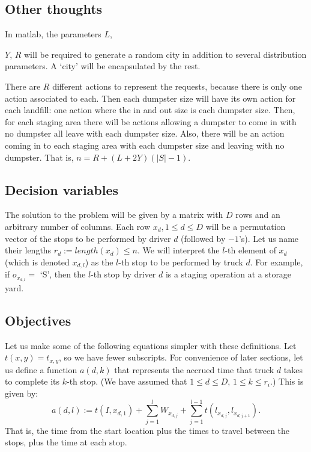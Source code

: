 \documentclass{article}
\begin{document}
\subsection{Other thoughts}

In matlab, the parameters 
  $L$,

  $Y$,
  $R$
will be required to generate a random city in addition to several distribution parameters.
A `city' will be encapsulated by the rest.

There are $R$ different actions to represent the requests, because there is only one action associated to each.
Then each dumpster size will have its own action for each landfill: one action where the in and out size is each dumpster size.
Then, for each staging area there will be actions allowing a dumpster to come in with no dumpster all leave with each dumpster size.
Also, there will be an action coming in to each staging area with each dumpster size and leaving with no dumpster.
That is, $n = R + (L + 2 Y) (|S| - 1)$.

\subsection{Decision variables}

The solution to the problem will be given by a matrix with $D$ rows and an arbitrary number of columns.
Each row $x_d, 1 \le d \le D$ will be a permutation vector of the stops to be performed by driver $d$ (followed by $-1$'s).
Let us name their lengths $r_d := length(x_d) \le n$.
We will interpret the $l$-th element of $x_{d}$ (which is denoted $x_{d,l}$) as the $l$-th stop to be performed by truck $d$.
For example, if $o_{x_{d,l}} =$ `S', then the $l$-th stop by driver $d$ is a staging operation at a storage yard.

\subsection{Objectives}

Let us make some of the following equations simpler with these definitions.
Let $t(x,y) = t_{x,y}$, so we have fewer subscripts.
For convenience of later sections, let us define a function $a(d, k)$ that represents the accrued time that truck $d$ takes to complete its $k$-th stop.
(We have assumed that $1 \le d \le D$, $1 \le k \le r_i$.)
This is given by:
$$a(d,l) := t(I, x_{d, 1}) + \sum_{j=1}^{l} W_{x_{d,j}} + \sum_{j=1}^{l-1} t(l_{x_{d,j}},l_{x_{d,j+1}} ).$$
That is, the time from the start location plus the times to travel between the stops, plus the time at each stop.
\end{document}
